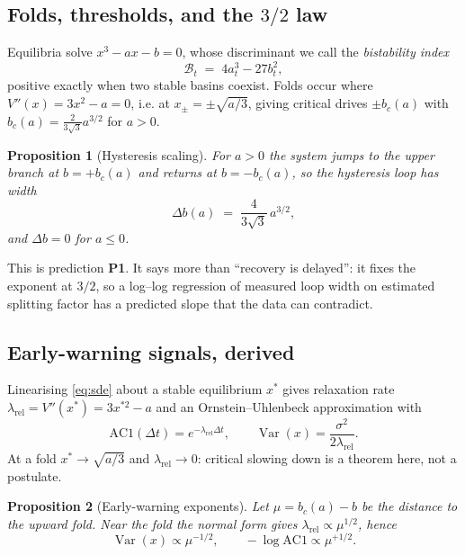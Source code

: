 \documentclass[conference]{IEEEtran}
\newtheorem{proposition}{Proposition}
\DeclareMathOperator{\Var}{Var}
\newcommand{\Bidx}{\mathcal{B}}
\begin{document}
\subsection{Folds, thresholds, and the $3/2$ law}

Equilibria solve $x^3-ax-b=0$, whose discriminant we call the
\emph{bistability index}
\begin{equation}
\Bidx_t \;=\; 4a_t^{3}-27b_t^{2},
\label{eq:bistab}
\end{equation}
positive exactly when two stable basins coexist. Folds occur where
$V''(x)=3x^2-a=0$, i.e. at $x_\pm=\pm\sqrt{a/3}$, giving critical drives
$\pm b_c(a)$ with $b_c(a)=\tfrac{2}{3\sqrt3}a^{3/2}$ for $a>0$.

\begin{proposition}[Hysteresis scaling]
\label{prop:hyst}
For $a>0$ the system jumps to the upper branch at $b=+b_c(a)$ and returns at
$b=-b_c(a)$, so the hysteresis loop has width
\begin{equation}
\Delta b(a)\;=\;\frac{4}{3\sqrt3}\,a^{3/2},
\label{eq:hyst}
\end{equation}
and $\Delta b=0$ for $a\le0$.
\end{proposition}

\noindent This is prediction \textbf{P1}. It says more than ``recovery is
delayed'': it fixes the exponent at $3/2$, so a log--log regression of measured
loop width on estimated splitting factor has a predicted slope that the data
can contradict.

\subsection{Early-warning signals, derived}

Linearising \eqref{eq:sde} about a stable equilibrium $x^\ast$ gives relaxation
rate $\lambda_{\mathrm{rel}}=V''(x^\ast)=3x^{\ast2}-a$ and an
Ornstein--Uhlenbeck approximation with
\begin{equation}
\mathrm{AC1}(\Delta t)=e^{-\lambda_{\mathrm{rel}}\Delta t},
\qquad
\Var(x)=\frac{\sigma^{2}}{2\lambda_{\mathrm{rel}}}.
\label{eq:ou}
\end{equation}
At a fold $x^\ast\to\sqrt{a/3}$ and $\lambda_{\mathrm{rel}}\to0$: critical
slowing down is a theorem here, not a postulate.

\begin{proposition}[Early-warning exponents]
\label{prop:ews}
Let $\mu=b_c(a)-b$ be the distance to the upward fold. Near the fold the normal
form gives $\lambda_{\mathrm{rel}}\propto\mu^{1/2}$, hence
\begin{equation}
\Var(x)\propto\mu^{-1/2},
\qquad
-\log\mathrm{AC1}\propto\mu^{+1/2}.
\label{eq:exponents}
\end{equation}
\end{proposition}
\end{document}
